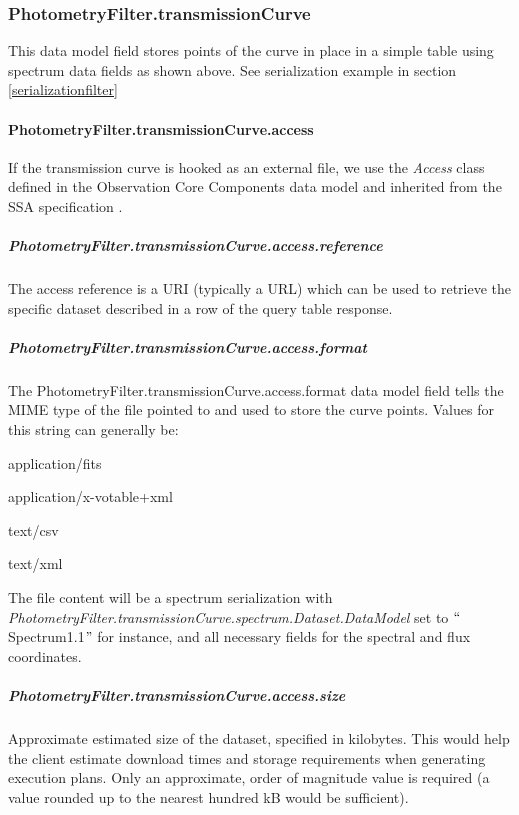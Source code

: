 \documentclass[11pt,a4paper]{ivoa}
\begin{document}
\subsubsection{PhotometryFilter.transmissionCurve}
This data model field stores points of the curve in place in a simple table using spectrum 
data fields as shown above. See serialization example in section 
\ref{serializationfilter} \par

\paragraph{PhotometryFilter.transmissionCurve.access}
If the transmission curve is hooked as an external file, we use the \textit{Access} class 
defined in the Observation Core Components data model \citep{2017ivoa.spec.0509L} and inherited 
from the SSA specification \citep{2012ivoa.spec.0210T}.
\par

\subparagraph{PhotometryFilter.transmissionCurve.access.reference} 

The access reference is a URI (typically a URL) which can be used to retrieve the 
specific dataset described in a row of the query table response. \par

\subparagraph{PhotometryFilter.transmissionCurve.access.format}
The PhotometryFilter.transmissionCurve.access.format data model field tells the MIME 
type of the file pointed to and used to store the curve points. Values for this 
string can generally be:\par

application/fits \par
application/x-votable+xml \par
text/csv \par
text/xml
\bigskip



The file content will be a spectrum serialization with 
\textit{PhotometryFilter.transmissionCurve.spectrum.Dataset.DataModel} set to 
$``$Spectrum1.1$"$  for instance, and all necessary fields for the spectral and 
flux coordinates.
\par

\subparagraph{PhotometryFilter.transmissionCurve.access.size} 
Approximate estimated size of the dataset, specified in kilobytes. This would 
help the client estimate download times and storage requirements when generating 
execution plans. Only an approximate, order of magnitude value is required (a value 
rounded up to the nearest hundred kB would be sufficient).\par
\end{document}
